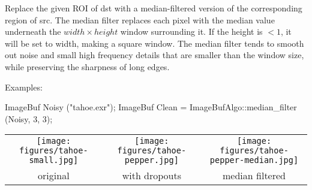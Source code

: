 

Replace the given ROI of {\cf dst} with a median-filtered version of the
corresponding region of {\cf src}.  The median filter replaces each pixel
with the median value underneath the $\mathit{width} \times \mathit{height}$
window surrounding it. If the height is $< 1$, it will be set to width,
making a square window. The median filter tends to smooth out noise and
small high frequency details that are smaller than the window size, while
preserving the sharpness of long edges.

\smallskip
\noindent Examples:
\begin{code}
    ImageBuf Noisy ("tahoe.exr");
    ImageBuf Clean = ImageBufAlgo::median_filter (Noisy, 3, 3);
\end{code}

\spc \begin{tabular}{ccc}
\texttt{[image: figures/tahoe-small.jpg]} &
\texttt{[image: figures/tahoe-pepper.jpg]} &
\texttt{[image: figures/tahoe-pepper-median.jpg]} \\
original & with dropouts & median filtered \\
\end{tabular}

\apiend


 
 

